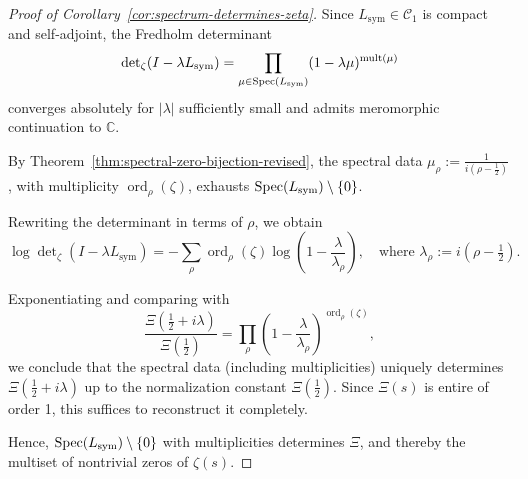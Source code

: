 \begin{proof}[Proof of Corollary~\ref{cor:spectrum-determines-zeta}]
Since \( L_{\mathrm{sym}} \in \mathcal{C}_1 \) is compact and self-adjoint, the Fredholm determinant
\[
\det\nolimits_\zeta(I - \lambda L_{\mathrm{sym}})
= \prod_{\mu \in \operatorname{Spec}(L_{\mathrm{sym}})} (1 - \lambda \mu)^{\operatorname{mult}(\mu)}
\]
converges absolutely for \( |\lambda| \) sufficiently small and admits meromorphic continuation to \( \mathbb{C} \).

By Theorem~\ref{thm:spectral-zero-bijection-revised}, the spectral data \( \mu_\rho := \frac{1}{i(\rho - \tfrac{1}{2})} \), with multiplicity \( \operatorname{ord}_\rho(\zeta) \), exhausts \( \operatorname{Spec}(L_{\mathrm{sym}}) \setminus \{0\} \).

Rewriting the determinant in terms of \( \rho \), we obtain
\[
\log \det\nolimits_\zeta(I - \lambda L_{\mathrm{sym}})
= - \sum_{\rho} \operatorname{ord}_\rho(\zeta) \log\left(1 - \frac{\lambda}{\lambda_\rho} \right),
\quad \text{where } \lambda_\rho := i(\rho - \tfrac{1}{2}).
\]

Exponentiating and comparing with
\[
\frac{\Xi(\tfrac{1}{2} + i\lambda)}{\Xi(\tfrac{1}{2})}
= \prod_{\rho} \left(1 - \frac{\lambda}{\lambda_\rho}\right)^{\operatorname{ord}_\rho(\zeta)},
\]
we conclude that the spectral data (including multiplicities) uniquely determines \( \Xi(\tfrac{1}{2} + i\lambda) \) up to the normalization constant \( \Xi(\tfrac{1}{2}) \). Since \( \Xi(s) \) is entire of order 1, this suffices to reconstruct it completely.

Hence, \( \operatorname{Spec}(L_{\mathrm{sym}}) \setminus \{0\} \) with multiplicities determines \( \Xi \), and thereby the multiset of nontrivial zeros of \( \zeta(s) \).
\end{proof}
%  